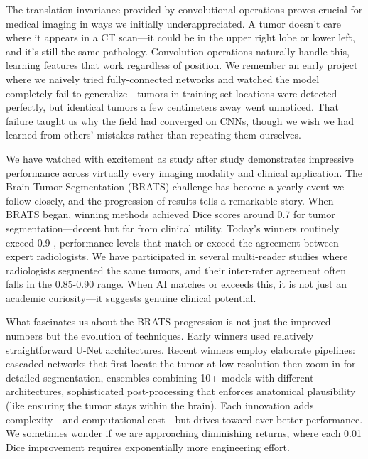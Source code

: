 \documentclass[12pt,a4paper]{article}
\begin{document}
The translation invariance provided by convolutional operations proves crucial for medical imaging in ways we initially underappreciated. A tumor doesn't care where it appears in a CT scan—it could be in the upper right lobe or lower left, and it's still the same pathology. Convolution operations naturally handle this, learning features that work regardless of position. We remember an early project where we naively tried fully-connected networks and watched the model completely fail to generalize—tumors in training set locations were detected perfectly, but identical tumors a few centimeters away went unnoticed. That failure taught us why the field had converged on CNNs, though we wish we had learned from others' mistakes rather than repeating them ourselves.

We have watched with excitement as study after study demonstrates impressive performance across virtually every imaging modality and clinical application. The Brain Tumor Segmentation (BRATS) challenge has become a yearly event we follow closely, and the progression of results tells a remarkable story. When BRATS began, winning methods achieved Dice scores around 0.7 for tumor segmentation—decent but far from clinical utility. Today's winners routinely exceed 0.9 \cite{bakas2018advancing}, performance levels that match or exceed the agreement between expert radiologists. We have participated in several multi-reader studies where radiologists segmented the same tumors, and their inter-rater agreement often falls in the 0.85-0.90 range. When AI matches or exceeds this, it is not just an academic curiosity—it suggests genuine clinical potential.

What fascinates us about the BRATS progression is not just the improved numbers but the evolution of techniques. Early winners used relatively straightforward U-Net architectures. Recent winners employ elaborate pipelines: cascaded networks that first locate the tumor at low resolution then zoom in for detailed segmentation, ensembles combining 10+ models with different architectures, sophisticated post-processing that enforces anatomical plausibility (like ensuring the tumor stays within the brain). Each innovation adds complexity—and computational cost—but drives toward ever-better performance. We sometimes wonder if we are approaching diminishing returns, where each 0.01 Dice improvement requires exponentially more engineering effort.
\end{document}

